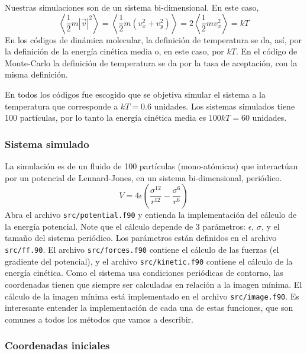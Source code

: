 \documentclass[10pt,a4paper,ssfamily]{exam}
\newcommand{\1}{{\bf 1}}
\newcommand{\2}{{\bf 2}}
\newcommand{\3}{{\bf 3}}
\begin{document}
Nuestras simulaciones son de un sistema bi-dimensional. En este caso,
\[
\left< \frac{1}{2}m |\vec{v}|^2 \right> = 
\left< \frac{1}{2}m \left(v_x^2 + v_y^2\right)\right> =
2\left< \frac{1}{2}m v_x^2 \right> = kT 
\]
En los códigos de dinámica molecular, la definición de temperatura se
da, así, por la definición de la energía cinética media o, en este caso,
por $kT$. En el código de Monte-Carlo la definición de temperatura se da
por la tasa de aceptación, con la misma definición. 

En todos los códigos fue escogido que se objetiva simular el sistema a
la temperatura que corresponde a $kT = 0.6$ unidades. Los sistemas
simulados tiene 100 partículas, por lo tanto la energía cinética media
es $100kT=60$ unidades.

\subsubsection*{Sistema simulado}

La simulación es de un fluido de 100 partículas (mono-atómicas) que
interactúan por un
potencial de Lennard-Jones, en un sistema bi-dimensional, periódico.
\[
V = 4\epsilon \left( \frac{\sigma^{12}}{r^{12}} - \frac{\sigma^6}{r^6} \right)
\]
Abra el archivo {\tt src/potential.f90} y entienda la implementación del
cálculo de la energía potencial. Note que el cálculo depende de 3
parámetros: $\epsilon$, $\sigma$, y el tamaño del sistema periódico. Los
parámetros están definidos en el archivo {\tt src/ff.90}. El archivo
{\tt src/forces.f90} contiene el cálculo de las fuerzas (el gradiente
del potencial), y el archivo {\tt src/kinetic.f90} contiene el cálculo
de la energía cinética. Como el sistema usa condiciones periódicas de
contorno, las coordenadas tienen que siempre ser calculadas en relación
a la imagen mínima. El cálculo de la imagen mínima está implementado en
el archivo {\tt src/image.f90}. Es interesante entender la
implementación de cada una de estas funciones, que son comunes a todos
los métodos que vamos a describir.   

\subsubsection*{Coordenadas iniciales}
\end{document}

